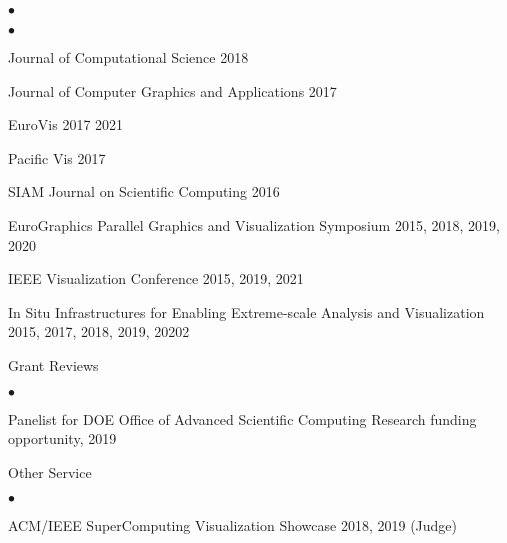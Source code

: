 \documentclass[margin,line]{res}
\newenvironment{list2}{
  \begin{list}{$\bullet$}{%
      \setlength{\itemsep}{0in}
      \setlength{\parsep}{0in} \setlength{\parskip}{0in}
      \setlength{\topsep}{0in} \setlength{\partopsep}{0in}
      \setlength{\leftmargin}{0.2in}}}{\end{list}}
\begin{document}
\begin{resume}
\begin{list2}
\begin{list2}
		\item Journal of Computational Science 2018
		\item Journal of Computer Graphics and Applications 2017
		\item EuroVis 2017 2021
		\item Pacific Vis 2017
		\item SIAM Journal on Scientific Computing 2016
		\item EuroGraphics Parallel Graphics and Visualization Symposium 2015, 2018, 2019, 2020
		\item IEEE Visualization Conference 2015, 2019, 2021
		\item In Situ Infrastructures for Enabling Extreme-scale Analysis and Visualization  2015, 2017, 2018, 2019, 20202
	\end{list2}
	\item Grant Reviews
	\begin{list2}
    \item Panelist for DOE Office of Advanced Scientific Computing Research funding opportunity, 2019
	\end{list2}
	\item Other Service
	\begin{list2}
		\item ACM/IEEE SuperComputing Visualization Showcase 2018, 2019 (Judge)
	\end{list2}
\end{list2}

\end{resume}
\end{document}
